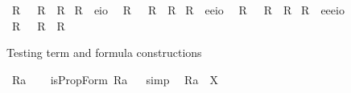 \begin{isabellebody}
\ R{}\ \ \ {\isachardoublequoteopen}R{}\ {\isasymequiv}\ {\isachardot}R{\isacharunderscore}{}{\isachardot}{\isachardoublequoteclose}\isanewline
{}\isamarkupfalse%
\ R{\isacharunderscore}{}\ {\isacharcolon}{\isacharcolon}\ {\isachardoublequoteopen}e{\isasymRightarrow}io{\isachardoublequoteclose}\ \isamarkupfalse%
\ R{}\ \ \ {\isachardoublequoteopen}R{}\ {\isasymequiv}\ {\isachardot}R{\isacharunderscore}{}{\isachardot}{\isachardoublequoteclose}\isanewline
{}\isamarkupfalse%
\ R{\isacharunderscore}{}\ {\isacharcolon}{\isacharcolon}\ {\isachardoublequoteopen}e{\isasymRightarrow}e{\isasymRightarrow}io{\isachardoublequoteclose}\ \isamarkupfalse%
\ R{}\ \ \ {\isachardoublequoteopen}R{}\ {\isasymequiv}\ {\isachardot}R{\isacharunderscore}{}{\isachardot}{\isachardoublequoteclose}\isanewline
{}\isamarkupfalse%
\ R{\isacharunderscore}{}\ {\isacharcolon}{\isacharcolon}\ {\isachardoublequoteopen}e{\isasymRightarrow}e{\isasymRightarrow}e{\isasymRightarrow}io{\isachardoublequoteclose}\ \ \isamarkupfalse%
\ R{}\ \ \ {\isachardoublequoteopen}R{}\ {\isasymequiv}\ {\isachardot}R{\isacharunderscore}{}{\isachardot}{\isachardoublequoteclose}%
\begin{isamarkuptext}%
Testing term and formula constructions%
\end{isamarkuptext}%
\isamarkuptrue%
\isamarkupfalse%
\ {\isachardoublequoteopen}{\isacharbrackleft}{\isacharless}R{}{\isasymbullet}a{\isachargreater}{\isacharbrackright}{\isachardoublequoteclose}\ \isamarkupfalse%
%
\isadelimproof
\ %
\endisadelimproof
%
\isatagproof
{}\isamarkupfalse%
%
\endisatagproof
{\isafoldproof}%
%
\isadelimproof
%
\endisadelimproof
\isanewline
{}\isamarkupfalse%
\ {\isachardoublequoteopen}isPropForm\ {\isacharless}R{}{\isasymbullet}a{\isachargreater}{\isachardoublequoteclose}%
\isadelimproof
\ %
\endisadelimproof
%
\isatagproof
{}\isamarkupfalse%
\ simp\ \isamarkupfalse%
%
\endisatagproof
{\isafoldproof}%
%
\isadelimproof
%
\endisadelimproof
\isanewline
{}\isamarkupfalse%
\ {\isachardoublequoteopen}{\isacharless}R{}{\isasymbullet}a{\isachargreater}\ {\isacharequal}\ X{\isachardoublequoteclose}%

\end{isabellebody}
